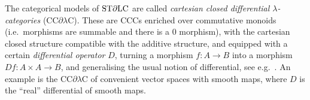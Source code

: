 The categorical models of $\mathrm{ST}\partial\mathrm{LC}$ are called \emph{cartesian closed
 differential $\lambda$-categories} (CC$\partial\lambda$C)\cite{Manzo2010,Blute2009, Blute2019}. These are CCCs enriched over commutative monoids (i.e.\ morphisms are summable and there is a $0$ morphism), with the cartesian closed structure compatible with the additive structure, 
and equipped with a certain \emph{differential operator} $D$, turning a morphism $f:A\to B$ into a morphism $Df: A\times A\to B$, and 
generalising the usual notion of differential, see e.g.\ \cite{BluteEhrhTass10}.
An example is the CC$\partial\lambda$C of convenient vector spaces with smooth maps, where $D$ is the ``real'' differential of smooth maps.

